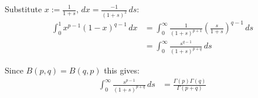\documentclass[12pt]{article}
\begin{document}
Substitute $x := \frac{1}{1+s}$, $dx = \frac{-1}{(1 + s)^2}\,ds$:
\begin{align*}
\int_{0}^{1} x^{p-1} (1 - x)^{q-1} \,dx &= \int_{0}^{\infty} \frac{1}{(1+s)^{p+1}} \left(\frac{s}{1+s}\right)^{q-1}\,ds \\
&= \int_{0}^{\infty} \frac{s^{q-1}}{(1 + s)^{p+q}} \,ds
\end{align*}

Since $B(p,q) = B(q,p)$ this gives:
\begin{align*}
\int_{0}^{\infty} \frac{s^{p-1}}{(1 + s)^{p+q}} \,ds &= \frac{\Gamma(p) \Gamma(q)}{\Gamma(p+q)}
\end{align*}
\end{document}
